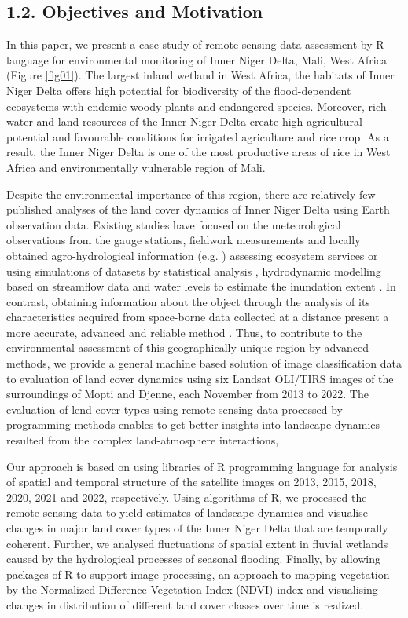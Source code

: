 \documentclass[12pt,a4paper,oneside]{article}
\def \newpar{\vspace{6pt}}
\begin{document}
\subsection*{1.2. Objectives and Motivation}

\newpar In this paper, we present a case study of remote sensing data assessment by R language for environmental monitoring of Inner Niger Delta, Mali, West Africa (Figure \ref{fig01}). The largest inland wetland in West Africa, the habitats of Inner Niger Delta offers high potential for biodiversity of the flood-dependent ecosystems with endemic woody plants and endangered species. Moreover, rich water and land resources of the Inner Niger Delta create high agricultural potential and favourable conditions for irrigated agriculture and rice crop. As a result, the Inner Niger Delta is one of the most productive areas of rice in West Africa and environmentally vulnerable region of Mali.

\newpar Despite the environmental importance of this region, there are relatively few published analyses of the land cover dynamics of Inner Niger Delta using Earth observation data. Existing studies have focused on the meteorological observations from the gauge stations, fieldwork measurements and locally obtained agro-hydrological information (e.g. \citep{dadson2010wetland}) assessing ecosystem services \citep{REBELO201358} or using simulations of datasets by statistical analysis \cite{Mascaro}, hydrodynamic modelling based on streamflow data and water levels to estimate the inundation extent \citep{HAQUE2020100703,HAQUE2021104187}. In contrast, obtaining information about the object through the analysis of its characteristics acquired from space-borne data collected at a distance present a more accurate, advanced and reliable method \citep{Maini,rs70202127}. Thus, to contribute to the environmental assessment of this geographically unique region by advanced methods, we provide a general machine based solution of image classification data to evaluation of land cover dynamics using six Landsat OLI/TIRS images of the surroundings of Mopti and Djenne, each November from 2013 to 2022. The evaluation of lend cover types using remote sensing data processed by programming methods enables to get better insights into landscape dynamics resulted from the complex land-atmosphere interactions, 

\newpar Our approach is based on using libraries of R programming language for analysis of spatial and temporal structure of the satellite images on 2013, 2015, 2018, 2020, 2021 and 2022, respectively. Using algorithms of R, we processed the remote sensing data to yield estimates of landscape dynamics and visualise changes in major land cover types of the Inner Niger Delta that are temporally coherent. Further, we analysed fluctuations of spatial extent in fluvial wetlands caused by the hydrological processes of seasonal flooding. Finally, by allowing packages of R to support image processing, an approach to mapping vegetation by the Normalized Difference Vegetation Index (NDVI) index and visualising changes in distribution of different land cover classes over time is realized. 
\end{document}
